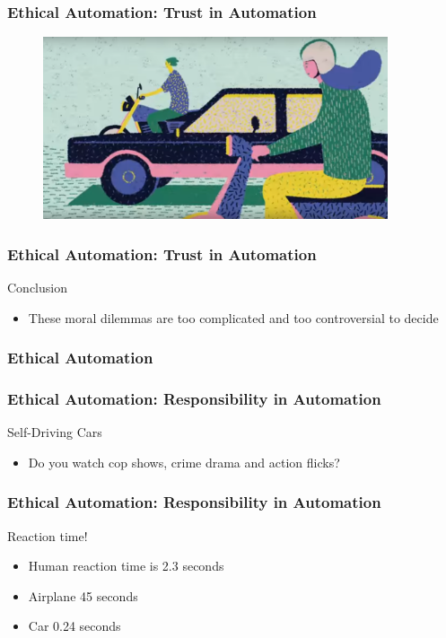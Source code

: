 \begin{frame}
  \frametitle{ Ethical Automation: Trust in Automation}
  \begin{figure}[bht]
    \centering
    \includegraphics[width=4in]{diagrams/image01}
  \end{figure}
\end{frame}


\begin{frame}
  \frametitle{ Ethical Automation: Trust in Automation}
  {\Large Conclusion}
  \begin{itemize}
    \item These moral dilemmas are too complicated and too controversial to decide
  \end{itemize}
\end{frame}


\begin{frame}
  \frametitle{ Ethical Automation}
\end{frame}


\begin{frame}
  \frametitle{ Ethical Automation: Responsibility in Automation}
  {\Large Self-Driving Cars}
  \begin{itemize}
    \item Do you watch cop shows, crime drama and action flicks?
  \end{itemize}
\end{frame}

\begin{frame}
  \frametitle{ Ethical Automation: Responsibility in Automation}
  {\Large Reaction time!}
  \begin{itemize}
    \item Human reaction time is 2.3 seconds
    \item Airplane 45 seconds
    \item Car 0.24 seconds
  \end{itemize}
\end{frame}

